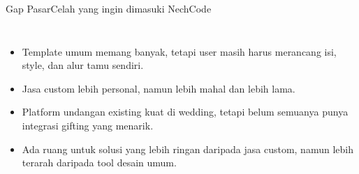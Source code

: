 \documentclass[aspectratio=169,11pt]{beamer}
\begin{document}
\begin{frame}{Gap Pasar}{Celah yang ingin dimasuki NechCode}
\begin{columns}[T,totalwidth=\textwidth]
\begin{itemize}
  \item Template umum memang banyak, tetapi user masih harus merancang isi, style, dan alur tamu sendiri.
  \item Jasa custom lebih personal, namun lebih mahal dan lebih lama.
  \item Platform undangan existing kuat di wedding, tetapi belum semuanya punya integrasi gifting yang menarik.
  \item Ada ruang untuk solusi yang lebih ringan daripada jasa custom, namun lebih terarah daripada tool desain umum.
\end{itemize}

\end{columns}
\end{frame}
\end{document}
